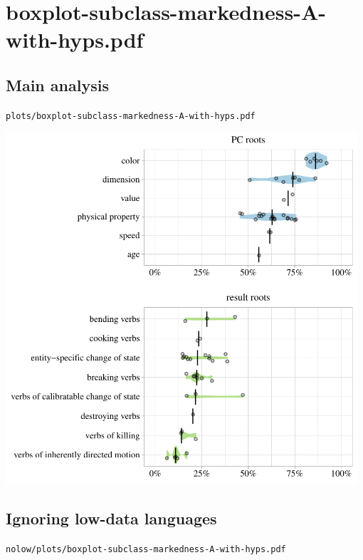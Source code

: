 \eject

\section{boxplot-subclass-markedness-A-with-hyps.pdf}

\subsection{Main analysis}

\texttt{plots/boxplot-subclass-markedness-A-with-hyps.pdf}

\includegraphics[width=0.98\textwidth]{../plots/boxplot-subclass-markedness-A-with-hyps.pdf}

\subsection{Ignoring low-data languages}

\texttt{nolow/plots/boxplot-subclass-markedness-A-with-hyps.pdf}

